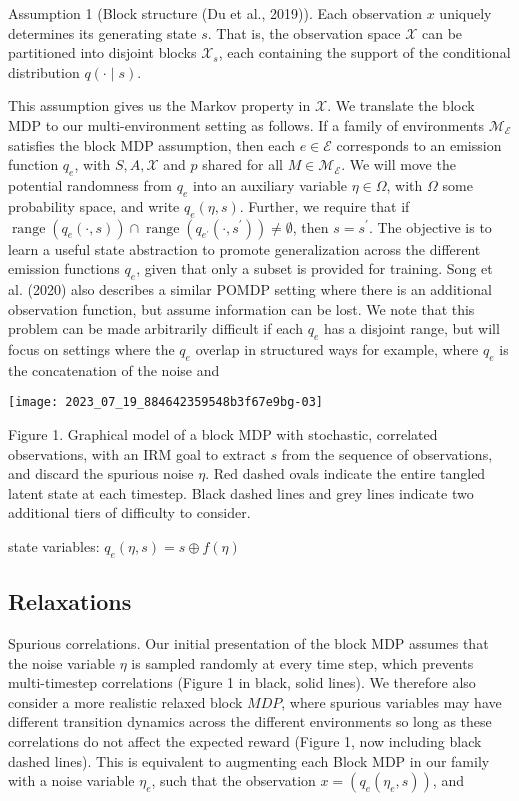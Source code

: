 \documentclass[10pt]{article}
\begin{document}
Assumption 1 (Block structure (Du et al., 2019)). Each observation $x$ uniquely determines its generating state $s$. That is, the observation space $\mathcal{X}$ can be partitioned into disjoint blocks $\mathcal{X}_{s}$, each containing the support of the conditional distribution $q(\cdot \mid s)$.

This assumption gives us the Markov property in $\mathcal{X}$. We translate the block MDP to our multi-environment setting as follows. If a family of environments $\mathcal{M}_{\mathcal{E}}$ satisfies the block MDP assumption, then each $e \in \mathcal{E}$ corresponds to an emission function $q_{e}$, with $S, A, \mathcal{X}$ and $p$ shared for all $M \in \mathcal{M}_{\mathcal{E}}$. We will move the potential randomness from $q_{e}$ into an auxiliary variable $\eta \in \Omega$, with $\Omega$ some probability space, and write $q_{e}(\eta, s)$. Further, we require that if $\operatorname{range}\left(q_{e}(\cdot, s)\right) \cap \operatorname{range}\left(q_{e^{\prime}}\left(\cdot, s^{\prime}\right)\right) \neq \emptyset$, then $s=s^{\prime}$. The objective is to learn a useful state abstraction to promote generalization across the different emission functions $q_{e}$, given that only a subset is provided for training. Song et al. (2020) also describes a similar POMDP setting where there is an additional observation function, but assume information can be lost. We note that this problem can be made arbitrarily difficult if each $q_{e}$ has a disjoint range, but will focus on settings where the $q_{e}$ overlap in structured ways for example, where $q_{e}$ is the concatenation of the noise and

\begin{center}
\texttt{[image: 2023\_07\_19\_884642359548b3f67e9bg-03]}
\end{center}

Figure 1. Graphical model of a block MDP with stochastic, correlated observations, with an IRM goal to extract $s$ from the sequence of observations, and discard the spurious noise $\eta$. Red dashed ovals indicate the entire tangled latent state at each timestep. Black dashed lines and grey lines indicate two additional tiers of difficulty to consider.

state variables: $q_{e}(\eta, s)=s \oplus f(\eta)$

\subsection{Relaxations}
Spurious correlations. Our initial presentation of the block MDP assumes that the noise variable $\eta$ is sampled randomly at every time step, which prevents multi-timestep correlations (Figure 1 in black, solid lines). We therefore also consider a more realistic relaxed block $M D P$, where spurious variables may have different transition dynamics across the different environments so long as these correlations do not affect the expected reward (Figure 1, now including black dashed lines). This is equivalent to augmenting each Block MDP in our family with a noise variable $\eta_{e}$, such that the observation $x=\left(q_{e}\left(\eta_{e}, s\right)\right)$, and
\end{document}
